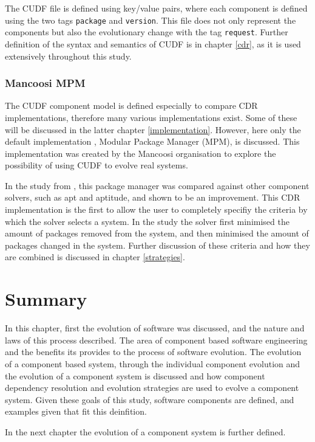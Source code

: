 The CUDF file is defined using key/value pairs, where each component is defined using the two tags \verb+package+ and \verb+version+.
This file does not only represent the components but also the evolutionary change with the tag \verb+request+.
Further definition of the syntax and semantics of CUDF is in chapter \ref{cdr}, as it is used extensively throughout this study.

\subsubsection{Mancoosi MPM}
The CUDF component model is defined especially to compare CDR implementations, therefore many various implementations exist.
Some of these will be discussed in the latter chapter \ref{implementation}.
However, here only the default implementation , Modular Package Manager \citep{abate2011} (MPM), is discussed.
This implementation was created by the Mancoosi organisation to explore the possibility of using CUDF to evolve real systems.

In the study from \cite{abate2011}, this package manager was compared against other component solvers, such as apt and aptitude, and shown to be an improvement.
This CDR implementation is the first to allow the user to completely specifiy the criteria by which the solver selects a system.
In the study the solver first minimised the amount of packages removed from the system, and then minimised the amount of packages changed in the system.
Further discussion of these criteria and how they are combined is discussed in chapter \ref{strategies}. 

\section{Summary}

In this chapter, first the evolution of software was discussed, and the nature and laws of this process described.
The area of component based software engineering and the benefits its provides to the process of software evolution.
The evolution of a component based system, through the individual component evolution and the evolution of a component system is discussed
and how component dependency resolution and evolution strategies are used to evolve a component system.
Given these goals of this study, software components are defined, and examples given that fit this deinfition.

In the next chapter the evolution of a component system is further defined.













